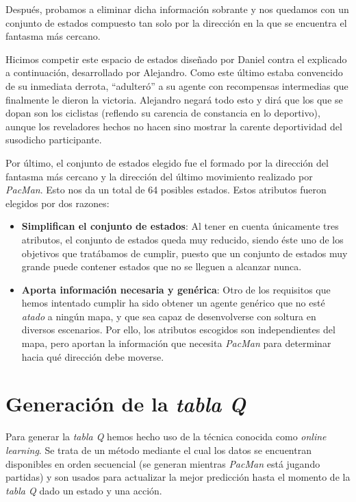 \documentclass[12pt]{article}
\begin{document}
Después, probamos a eliminar dicha información sobrante y nos quedamos con un conjunto de estados compuesto tan solo por la dirección en la que se encuentra el fantasma más cercano.

Hicimos competir este espacio de estados diseñado por Daniel contra el explicado a continuación, desarrollado por Alejandro. Como este último estaba convencido de su inmediata derrota, ``adulteró'' a su agente con recompensas intermedias que finalmente le dieron la victoria. Alejandro negará todo esto y dirá que los que se dopan son los ciclistas (reflendo su carencia de constancia en lo deportivo), aunque los reveladores hechos no hacen sino mostrar la carente deportividad del susodicho participante.

Por último, el conjunto de estados elegido fue el formado por la dirección del fantasma más cercano y la dirección del último movimiento realizado por \textit{PacMan}. Esto nos da un total de 64 posibles estados. Estos atributos fueron elegidos por dos razones:
\begin{itemize}
	\item \textbf{Simplifican el conjunto de estados}: Al tener en cuenta únicamente tres atributos, el conjunto de estados queda muy reducido, siendo éste uno de los objetivos que tratábamos de cumplir, puesto que un conjunto de estados muy grande puede contener estados que no se lleguen a alcanzar nunca.
	\item \textbf{Aporta información necesaria y genérica}: Otro de los requisitos que hemos intentado cumplir ha sido obtener un agente genérico que no esté \textit{atado} a ningún mapa, y que sea capaz de desenvolverse con soltura en diversos escenarios. Por ello, los atributos escogidos son independientes del mapa, pero aportan la información que necesita \textit{PacMan} para determinar hacia qué dirección debe moverse.
\end{itemize}

\section{Generación de la \textit{tabla Q}}

Para generar la \textit{tabla Q} hemos hecho uso de la técnica conocida como \textit{online learning}. Se trata de un método mediante el cual los datos se encuentran disponibles en orden secuencial (se generan mientras \textit{PacMan} está jugando partidas) y son usados para actualizar la mejor predicción hasta el momento de la \textit{tabla Q} dado un estado y una acción.
\end{document}
